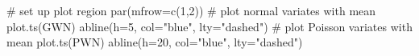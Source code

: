 \begin{Schunk}
\begin{Sinput}
 # set up plot region
 par(mfrow=c(1,2))
 # plot normal variates with mean
 plot.ts(GWN)
 abline(h=5, col="blue", lty="dashed")
 # plot Poisson variates with mean
 plot.ts(PWN)
 abline(h=20, col="blue", lty="dashed")
\end{Sinput}
\end{Schunk}
